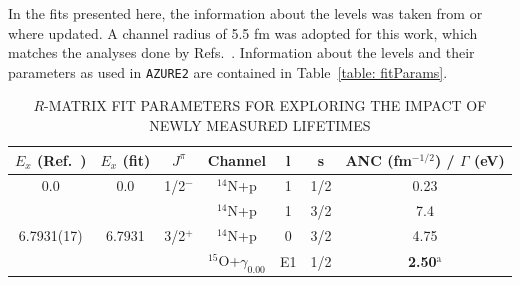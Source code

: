In the fits presented here, the information about the levels was taken from  \citet{Ajzenberg-Selove1991} or \citet{Daigle2016} where updated. A channel radius of 5.5 fm was adopted for this work, which matches the analyses done by Refs.~\cite{Adelberger2011, Li2016, Wagner2018}. Information about the levels and their parameters as used in \texttt{AZURE2} are contained in Table~\ref{table: fitParams}. 


\begin{table}[]
\caption{$R$-MATRIX FIT PARAMETERS FOR EXPLORING THE IMPACT OF NEWLY MEASURED LIFETIMES}
\begin{center}
\begin{threeparttable}
\begin{tabular}{c  c  c  c  c  c  c}
\toprule
$E_x$ (Ref.~\cite{Ajzenberg-Selove1991}) &   $E_x$ (fit) & $J^\pi$ & Channel & l & s & ANC (fm$^{-1/2}$) / $\Gamma$ (eV)\\ 
\midrule
0.0 & 0.0	& 1/2$^-$ &	$^{14}$N+p &	1&	1/2&	{0.23}\\
	&	&	    &    $^{14}$N+p &	1&	3/2&	{7.4} \\
6.7931(17) & {6.7931}&	3/2$^+$ & $^{14}$N+p &	0&	3/2&	{4.75}\\
	&	&	     &  $^{15}$O+$\gamma_{0.00}$	&  E1  &	1/2&	\textbf{2.50$^{\text{a}}$}\\

\end{tabular}
\end{threeparttable}
\end{center}
\end{table}
